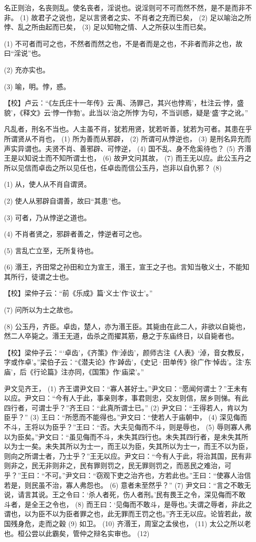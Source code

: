 \documentclass[12pt,UTF8]{ctexbook}
\begin{document}
名正则治，名丧则乱。使名丧者，淫说也。说淫则可不可而然不然，是不是而非不非。 (1) 故君子之说也，足以言贤者之实、不肖者之充而已矣， (2) 足以喻治之所悖、乱之所由起而已矣， (3) 足以知物之情、人之所获以生而已矣。

(1) 不可者而可之也，不然者而然之也，不是者而是之也，不非者而非之也，故曰“淫说”也。

(2) 充亦实也。

(3) 喻，明。悖，惑。

【校】卢云：“《左氏庄十一年传》云‘禹、汤罪己，其兴也悖焉’，杜注云‘悖，盛貌’，《释文》云‘悖一作勃’。此当以‘治之所悖’为句，不当训惑，疑是‘盛’字之讹。”

凡乱者，刑名不当也。人主虽不肖，犹若用贤，犹若听善，犹若为可者。其患在乎所谓贤从不肖也， (1) 所为善而从邪辟， (2) 所谓可从悖逆也， (3) 是刑名异充而声实异谓也。夫贤不肖、善邪辟、可悖逆， (4) 国不乱、身不危奚待也？ (5) 齐湣王是以知说士而不知所谓士也， (6) 故尹文问其故， (7) 而王无以应。此公玉丹之所以见信而卓齿之所以见任也，任卓齿而信公玉丹，岂非以自仇邪？ (8)

(1) 从，使人从不肖自谓贤。

(2) 使人从邪辟自谓善，故曰“其患”也。

(3) 可者，乃从悖逆之道也。

(4) 不肖者贤之，邪辟者善之，悖逆者可之也。

(5) 言乱亡立至，无所复待也。

(6) 湣王，齐田常之孙田和立为宣王，湣王，宣王之子也。言知当敬义士，不能知其所行，徒谓之士也。

【校】梁仲子云：“前《乐成》篇‘义士’作‘议士’。”

(7) 问所以为士之故也。

(8) 公玉丹，齐臣。卓齿，楚人，亦为湣王臣。其毙由在此二人，非欲以自毙也，然二人卒毙之。湣王无道，齿杀之而擢其筋，悬之于东庙终日，以自毙者也。

【校】梁仲子云：“‘卓齿’，《齐策》作‘淖齿’，颜师古注《人表》‘淖，音女教反，字或作卓’。”梁伯子云：“《潜夫论》作‘踔齿’，《史记·田单传》徐广作‘悼齿’。注‘东庙’，后《行论篇》注亦同，《国策》作‘庙梁’。”

尹文见齐王， (1) 齐王谓尹文曰：“寡人甚好士。”尹文曰：“愿闻何谓士？”王未有以应。尹文曰：“今有人于此，事亲则孝，事君则忠，交友则信，居乡则悌。有此四行者，可谓士乎？”齐王曰：“此真所谓士已。” (2) 尹文曰：“王得若人，肯以为臣乎？” (3) 王曰：“所愿而不能得也。”尹文曰：“使若人于庙朝中， (4) 深见侮而不斗，王将以为臣乎？”王曰：“否。大夫见侮而不斗，则是辱也， (5) 辱则寡人弗以为臣矣。”尹文曰：“虽见侮而不斗，未失其四行也。未失其四行者，是未失其所以为士一矣。未失其所以为士一，而王以为臣，失其所以为士一，而王不以为臣，则向之所谓士者，乃士乎？”王无以应。尹文曰：“今有人于此，将治其国，民有非则非之，民无非则非之，民有罪则罚之，民无罪则罚之，而恶民之难治，可乎？”王曰：“不可。”尹文曰：“窃观下吏之治齐也，方若此也。”王曰：“使寡人治信若是，则民虽不治，寡人弗怨也。 (6) 意者未至然乎？” (7) 尹文曰：“言之不敢无说，请言其说。王之令曰：‘杀人者死，伤人者刑。’民有畏王之令，深见侮而不敢斗者，是全王之令也， (8) 而王曰：‘见侮而不敢斗，是辱也。’夫谓之辱者，非此之谓也，以为臣不以为臣者罪之也，此无罪而王罚之也。”齐王无以应。论皆若此，故国残身危，走而之穀 (9) 如卫。 (10) 齐湣王，周室之孟侯也， (11) 太公之所以老也。桓公尝以此霸矣，管仲之辩名实审也。 (12)
\end{document}
